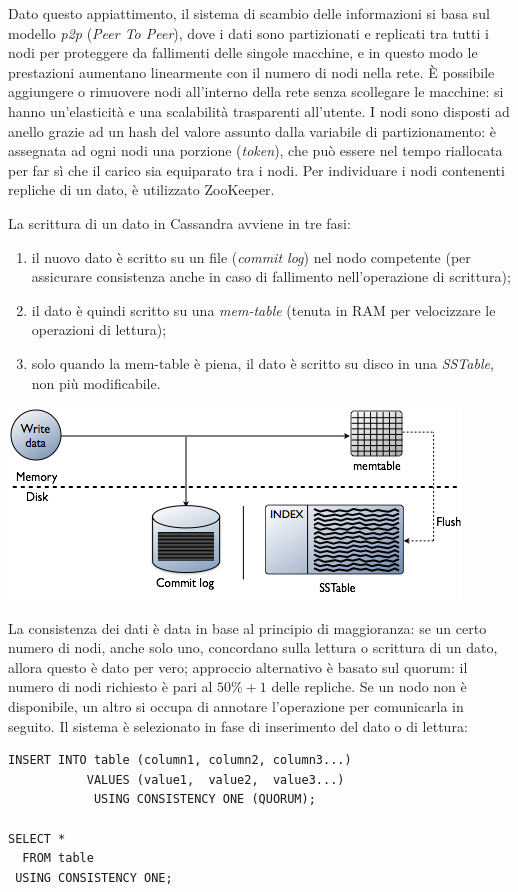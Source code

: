 \documentclass[a4page, 11pt]{article}
\begin{document}
Dato questo appiattimento, il sistema di scambio delle informazioni si basa sul modello \textit{p2p} (\textit{Peer To Peer}), dove i dati sono partizionati e replicati tra tutti i nodi per proteggere da fallimenti delle singole macchine, e in questo modo le prestazioni aumentano linearmente con il numero di nodi nella rete.
È possibile aggiungere o rimuovere nodi all'interno della rete senza scollegare le macchine: si hanno un'elasticità e una scalabilità trasparenti all'utente.
I nodi sono disposti ad anello grazie ad un hash del valore assunto dalla variabile di partizionamento: è assegnata ad ogni nodi una porzione (\textit{token}), che può essere nel tempo riallocata per far sì che il carico sia equiparato tra i nodi.
Per individuare i nodi contenenti repliche di un dato, è utilizzato ZooKeeper.

La scrittura di un dato in Cassandra avviene in tre fasi:
\begin{enumerate}
\item il nuovo dato è scritto su un file (\textit{commit log}) nel nodo competente (per assicurare consistenza anche in caso di fallimento nell'operazione di scrittura);
\item il dato è quindi scritto su una \textit{mem-table} (tenuta in RAM per velocizzare le operazioni di lettura);
\item solo quando la mem-table è piena, il dato è scritto su disco in una \textit{SSTable}, non più modificabile.
\end{enumerate}
\begin{center}
  \includegraphics[width=100 mm]{cassandrawrite.png}
\end{center}

La consistenza dei dati è data in base al principio di maggioranza: se un certo numero di nodi, anche solo uno, concordano sulla lettura o scrittura di un dato, allora questo è dato per vero; approccio alternativo è basato sul quorum: il numero di nodi richiesto è pari al $50\% + 1$ delle repliche.
Se un nodo non è disponibile, un altro si occupa di annotare l'operazione per comunicarla in seguito.
Il sistema è selezionato in fase di inserimento del dato o di lettura:
\begin{verbatim}
INSERT INTO table (column1, column2, column3...)
           VALUES (value1,  value2,  value3...)
            USING CONSISTENCY ONE (QUORUM);

SELECT *
  FROM table
 USING CONSISTENCY ONE;
\end{verbatim}
\end{document}
